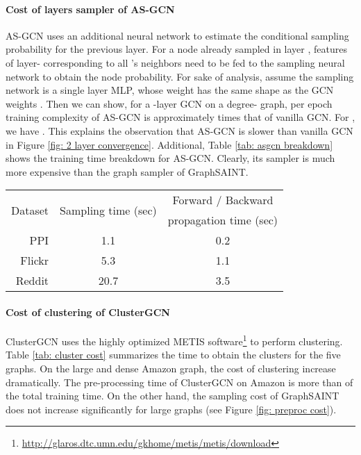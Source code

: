 \documentclass{article} \usepackage{iclr2020_conference,times}
\newcommand{\graphsaint}{{\fontfamily{lmtt}\selectfont GraphSAINT}}
\begin{document}
\paragraph{Cost of layers sampler of AS-GCN}
AS-GCN uses an additional neural network to estimate the conditional sampling probability for the previous layer. For a node  already sampled in layer , features of layer- corresponding to all 's neighbors need to be fed to the sampling neural network to obtain the node probability. For sake of analysis, assume the sampling network is a single layer MLP, whose weight  has the same shape as the GCN weights . 
Then we can show, for a -layer GCN on a degree- graph, per epoch training complexity of AS-GCN is approximately  times that of vanilla GCN. For , we have . This explains the observation that AS-GCN is slower than vanilla GCN in Figure \ref{fig: 2 layer convergence}. Additional, Table \ref{tab: asgcn breakdown} shows the training time breakdown for AS-GCN. Clearly, its sampler is much more expensive than the graph sampler of {\graphsaint}. 

\begin{table*}[!ht]
\caption{Per epoch training time breakdown for AS-GCN}
    \centering
\begin{tabular}{rcc}
        \toprule
        \multirow{2}{*}{Dataset} & \multirow{2}{*}{Sampling time (sec)} & {Forward / Backward}\\
        & & propagation time (sec)\\
        \midrule
        \midrule
        PPI & 1.1 & 0.2 \\
        Flickr & 5.3 & 1.1\\
        Reddit & 20.7 & 3.5 \\
        \bottomrule
    \end{tabular}\label{tab: asgcn breakdown}
\end{table*}


\paragraph{Cost of clustering of ClusterGCN}
ClusterGCN uses the highly optimized METIS software\footnote{\url{http://glaros.dtc.umn.edu/gkhome/metis/metis/download}} to perform clustering. Table \ref{tab: cluster cost} summarizes the time to obtain the clusters for the five graphs. On the large and dense Amazon graph, the cost of clustering increase dramatically. The pre-processing time of ClusterGCN on Amazon is more than  of the total training time. On the other hand, the sampling cost of {\graphsaint} does not increase significantly for large graphs (see Figure \ref{fig: preproc cost}). 
\end{document}
